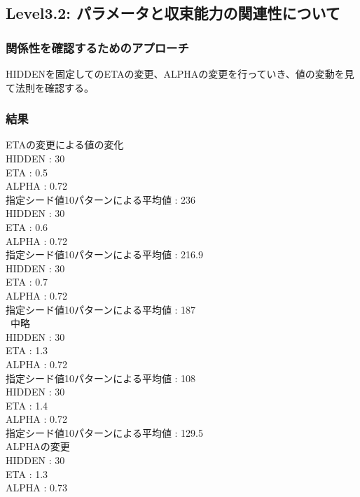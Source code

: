 \subsection{Level3.2: パラメータと収束能力の関連性について}
\subsubsection{関係性を確認するためのアプローチ}
HIDDENを固定してのETAの変更、ALPHAの変更を行っていき、値の変動を見て法則を確認する。

\subsubsection{結果}
ETAの変更による値の変化\\
HIDDEN : 30\\
ETA        : 0.5\\
ALPHA   : 0.72\\

指定シード値10パターンによる平均値 : 236\\

HIDDEN : 30\\
ETA        : 0.6\\
ALPHA   : 0.72\\

指定シード値10パターンによる平均値 : 216.9\\

HIDDEN : 30\\
ETA        : 0.7\\
ALPHA   : 0.72\\

指定シード値10パターンによる平均値 : 187\\


~中略~\\

HIDDEN : 30\\
ETA        : 1.3\\
ALPHA   : 0.72\\

指定シード値10パターンによる平均値 : 108\\


HIDDEN : 30\\
ETA        : 1.4\\
ALPHA   : 0.72\\

指定シード値10パターンによる平均値 : 129.5\\


ALPHAの変更\\
HIDDEN : 30\\
ETA        : 1.3\\
ALPHA   : 0.73\\

